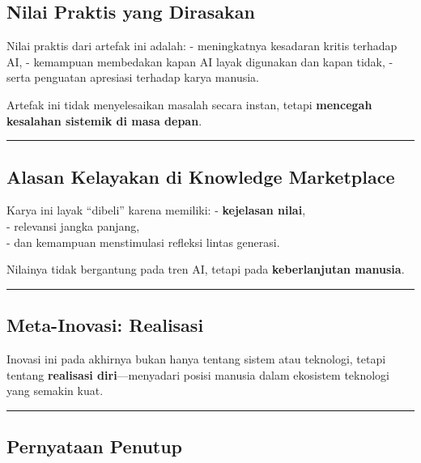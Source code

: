 \documentclass[
  letterpaper,
  DIV=11,
  numbers=noendperiod]{scrreprt}
\begin{document}
\subsection{Nilai Praktis yang
Dirasakan}\label{nilai-praktis-yang-dirasakan}

Nilai praktis dari artefak ini adalah: - meningkatnya kesadaran kritis
terhadap AI, - kemampuan membedakan kapan AI layak digunakan dan kapan
tidak, - serta penguatan apresiasi terhadap karya manusia.

Artefak ini tidak menyelesaikan masalah secara instan, tetapi
\textbf{mencegah kesalahan sistemik di masa depan}.

\begin{center}\rule{0.5\linewidth}{0.5pt}\end{center}

\subsection{Alasan Kelayakan di Knowledge
Marketplace}\label{alasan-kelayakan-di-knowledge-marketplace}

Karya ini layak ``dibeli'' karena memiliki: - \textbf{kejelasan
nilai},\\
- relevansi jangka panjang,\\
- dan kemampuan menstimulasi refleksi lintas generasi.

Nilainya tidak bergantung pada tren AI, tetapi pada
\textbf{keberlanjutan manusia}.

\begin{center}\rule{0.5\linewidth}{0.5pt}\end{center}

\subsection{Meta-Inovasi: Realisasi}\label{meta-inovasi-realisasi}

Inovasi ini pada akhirnya bukan hanya tentang sistem atau teknologi,
tetapi tentang \textbf{realisasi diri}---menyadari posisi manusia dalam
ekosistem teknologi yang semakin kuat.

\begin{center}\rule{0.5\linewidth}{0.5pt}\end{center}

\subsection{Pernyataan Penutup}\label{pernyataan-penutup}
\end{document}

